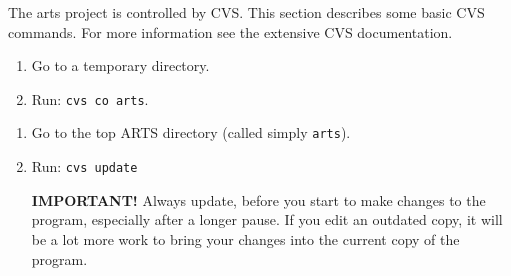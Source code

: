  \label{sec:development:cvs}

The arts project is controlled by CVS. This section describes some
basic CVS commands. For more information see the extensive CVS
documentation. 


\begin{enumerate}
\item Go to a temporary directory.
\item Run: \verb|cvs co arts|.
\end{enumerate}


\begin{enumerate}
\item Go to the top ARTS directory (called simply \verb|arts|).
\item Run: \verb|cvs update|
   
  \textbf{IMPORTANT!} Always update, before you start to make changes
  to the program, especially after a longer pause. If you edit an
  outdated copy, it will be a lot more work to bring your changes into
  the current copy of the program.
\end{enumerate}


